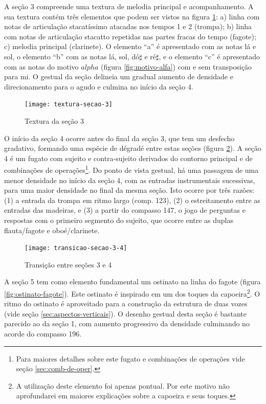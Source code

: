 A seção 3 compreende uma textura de melodia principal e
acompanhamento. A sua textura contém três elementos que podem ser
vistos na figura \ref{fig:textura-secao-3}: a) linha com notas de
articulação stacatíssimo atacadas nos tempos 1 e 2 (trompa); b) linha
com notas de articulação stacatto repetidas nas partes fracas do tempo
(fagote); c) melodia principal (clarinete). O elemento ``a'' é
apresentado com as notas lá e sol, o elemento ``b'' com as notas lá,
sol, dó$\sharp$ e ré$\sharp$, e o elemento ``c'' é apresentado com as
notas do motivo $alpha$ (figura \ref{fig:motivo-alfa}) com e sem
transposição para mi. O gestual da seção delineia um gradual aumento
de densidade e direcionamento para o agudo e culmina no início da
seção 4.

\begin{figure}
  \centering
  \texttt{[image: textura-secao-3]}
  \caption{Textura da seção 3}
  \label{fig:textura-secao-3}
\end{figure}

O início da seção 4 ocorre antes do final da seção 3, que tem um
desfecho gradativo, formando uma espécie de dégradé entre estas seções
(figura \ref{fig:transicao-secao-3-4}). A seção 4 é um fugato com
sujeito e contra-sujeito derivados do contorno principal e de
combinações de operações\footnote{Para maiores detalhes sobre este
  fugato e combinações de operações vide seção
  \ref{sec:comb-de-oper}.}. Do ponto de vista gestual, há uma passagem
de uma menor densidade no início da seção 4, com as entradas
instrumentais sucessivas, para uma maior densidade no final da mesma
seção. Isto ocorre por três razões: (1) a entrada da trompa em ritmo
largo (comp. 123), (2) o estreitamento entre as entradas das madeiras,
e (3) a partir do compasso 147, o jogo de perguntas e respostas com o
primeiro segmento do sujeito, que ocorre entre as duplas flauta/fagote
e oboé/clarinete.

\begin{figure}
  \centering
  \texttt{[image: transicao-secao-3-4]}
  \caption{Transição entre seções 3 e 4}
  \label{fig:transicao-secao-3-4}
\end{figure}

A seção 5 tem como elemento fundamental um ostinato na linha do fagote
(figura \ref{fig:ostinato-fagote}). Este ostinato é inspirado em um
dos toques da capoeira\footnote{A utilização deste elemento foi apenas
  pontual. Por este motivo não aprofundarei em maiores explicações
  sobre a capoeira e seus toques.}. O ritmo do ostinato é aproveitado
para a construção da estrutura de duas vozes (vide seção
\ref{sec:aspectos-verticais}). O desenho gestual desta seção é
bastante parecido ao da seção 1, com aumento progressivo da densidade
culminando no acorde do compasso 196.

